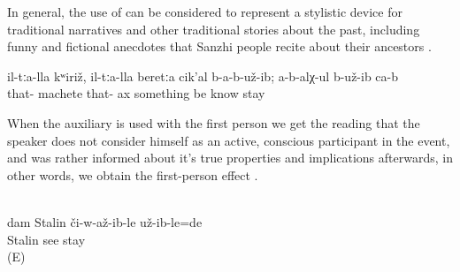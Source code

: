 In general, the use of  can be considered to represent a stylistic device for traditional narratives and other traditional stories about the past, including funny and fictional anecdotes that Sanzhi people recite about their ancestors .
%
\begin{exe}
	\ex	\label{ex:they had no machete nor ax, they did not know (these tools)}
	\gll	il-tːa-lla	kʷiriž,	il-tːa-lla	beretːa	cik'al	b-a-b-už-ib;	a-b-alχ-ul	b-už-ib	ca-b\\
		that-	machete	that-	ax	something	be	know	stay	\\
	\glt	{}
\end{exe}

When the auxiliary is used with the first person we get the reading that the speaker does not consider himself as an active, conscious participant in the event, and was rather informed about it's true properties and implications afterwards, in other words, we obtain the first-person effect .
%
\begin{exe}
	\\\label{ex:(It turned out, that) I had seen Stalin@17}%
	\gll	dam	Stalin	či-w-až-ib-le	už-ib-le=de\\
			Stalin	see	stay\\
	\glt	{} (E)
\end{exe}
